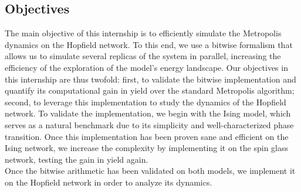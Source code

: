 \subsection{Objectives}
\myindent The main objective of this internship is to efficiently simulate the Metropolis dynamics on the Hopfield network. To this end, we use a bitwise formalism that allows us to simulate several replicas of the system in parallel, increasing the efficiency of the exploration of the model's energy landscape. Our objectives in this internship are thus twofold: first, to validate the bitwise implementation and quantify its computational gain in yield over the standard Metropolis algorithm;
second, to leverage this implementation to study the dynamics of the Hopfield network. To validate the implementation, we begin with the Ising model, which serves as a natural benchmark due to its simplicity and well-characterized phase transition. Once this implementation has been proven sane and efficient on the Ising network, we increase the complexity by implementing it on the spin glass network, testing the gain in yield again.\\
Once the bitwise arithmetic has been validated on both models, we implement it on the Hopfield network in order to analyze its dynamics.

